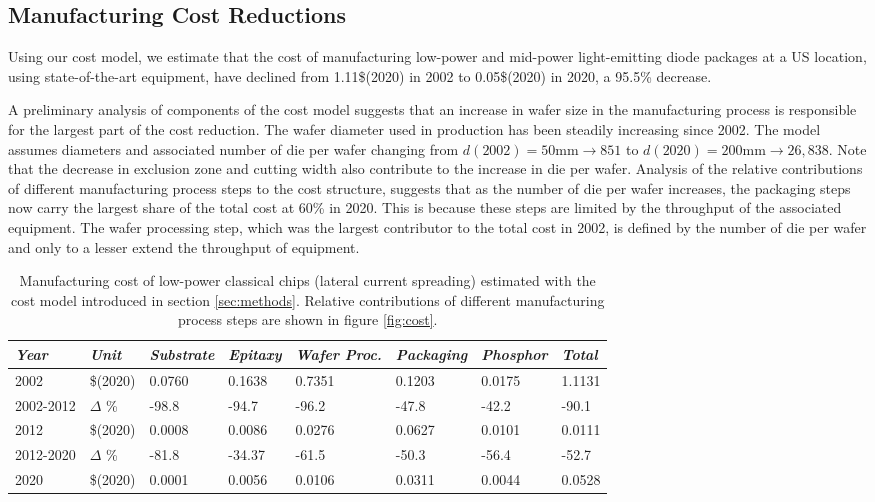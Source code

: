 \documentclass[a4paper,nocompress]{spie}  %
\begin{document}
\subsection{Manufacturing Cost Reductions}
    
    Using our cost model, we estimate that the cost of manufacturing low-power and mid-power light-emitting diode packages at a US location, using state-of-the-art equipment, have declined from 1.11\$(2020) in 2002 to 0.05\$(2020) in 2020, a 95.5\% decrease. 
    
    A preliminary analysis of components of the cost model suggests that an increase in wafer size in the manufacturing process is responsible for the largest part of the cost reduction. The wafer diameter used in production has been steadily increasing since 2002. The model assumes diameters and associated number of die per wafer changing from $d(2002)=50$mm$\rightarrow851$ to $d(2020)=200$mm$\rightarrow26,838$. Note that the decrease in exclusion zone and cutting width also contribute to the increase in die per wafer. Analysis of the relative contributions of different manufacturing process steps to the cost structure, suggests that as the number of die per wafer increases, the packaging steps now carry the largest share of the total cost at 60\% in 2020. This is because these steps are limited by the throughput of the associated equipment. The wafer processing step, which was the largest contributor to the total cost in 2002, is defined by the number of die per wafer and only to a lesser extend the throughput of equipment.
    
    \begin{table}[h!]
        \caption{Manufacturing cost of low-power classical chips (lateral current spreading) estimated with the cost model introduced in section \ref{sec:methods}. Relative contributions of different manufacturing process steps are shown in figure \ref{fig:cost}.}
        \bigskip
            \centering
            \begin{tabularx}{\textwidth}{|l|l|X|X|X|X|X|l|}
            	\hline
            		\textit{Year} & \textit{Unit} & \textit{Substrate} & \textit{Epitaxy} & \textit{Wafer Proc.} & \textit{Packaging} & \textit{Phosphor} & \textit{Total} \\
                \hline
                    2002 & \$(2020) & 0.0760 & 0.1638 & 0.7351 & 0.1203 & 0.0175 & 1.1131 \\
                \hline
                    2002-2012 & $\Delta$ \% & -98.8 & -94.7 & -96.2 & -47.8 & -42.2 & -90.1 \\
                \hline
                    2012 & \$(2020) & 0.0008 & 0.0086 & 0.0276 & 0.0627 & 0.0101 & 0.0111 \\
                \hline
                    2012-2020 & $\Delta$ \% & -81.8 & -34.37 & -61.5 & -50.3 & -56.4 & -52.7 \\
                \hline
                    2020 & \$(2020) & 0.0001 & 0.0056 & 0.0106 & 0.0311 & 0.0044 & 0.0528 \\
                \hline
            \end{tabularx}
            \label{tab:cost}
        \end{table}
\end{document}

